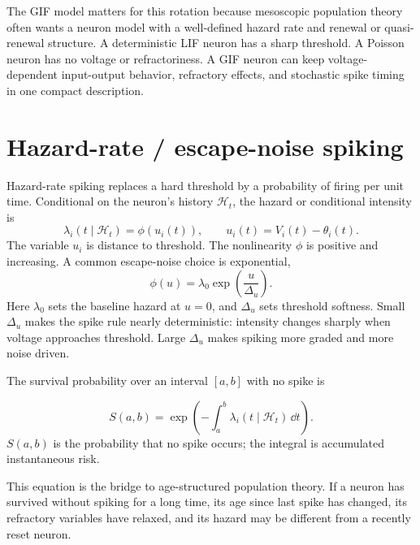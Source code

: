 The GIF model matters for this rotation because mesoscopic population theory often wants a neuron model with a well-defined hazard rate and renewal or quasi-renewal structure. A deterministic LIF neuron has a sharp threshold. A Poisson neuron has no voltage or refractoriness. A GIF neuron can keep voltage-dependent input-output behavior, refractory effects, and stochastic spike timing in one compact description.

\section{Hazard-rate / escape-noise spiking}
\label{sec:hazard-escape-noise}

Hazard-rate spiking replaces a hard threshold by a probability of firing per unit time. Conditional on the neuron's history $\mathcal{H}_t$, the hazard or conditional intensity is
%
\begin{equation}
  \lambda_i(t\mid\mathcal{H}_t)
  =
  \phi\!\left(u_i(t)\right),
  \qquad
  u_i(t)=V_i(t)-\theta_i(t).
  \label{eq:hazard-distance-threshold}
\end{equation}
%
The variable $u_i$ is distance to threshold. The nonlinearity $\phi$ is positive and increasing. A common escape-noise choice is exponential,
%
\begin{equation}
  \phi(u)
  =
  \lambda_0\exp\!\left(\frac{u}{\Delta_u}\right).
  \label{eq:exponential-escape-rate}
\end{equation}
%
Here $\lambda_0$ sets the baseline hazard at $u=0$, and $\Delta_u$ sets threshold softness. Small $\Delta_u$ makes the spike rule nearly deterministic: intensity changes sharply when voltage approaches threshold. Large $\Delta_u$ makes spiking more graded and more noise driven.

The survival probability over an interval $[a,b]$ with no spike is
%
\begin{keyequation}
\begin{equation}
  S(a,b)
  =
  \exp\!\left(
    -\int_a^b \lambda_i(t\mid\mathcal{H}_t)\,\dd t
  \right).
  \label{eq:hazard-survival}
\end{equation}
\tcblower
$S(a,b)$ is the probability that no spike occurs; the integral is accumulated instantaneous risk.
\end{keyequation}

\noindent This equation is the bridge to age-structured population theory. If a neuron has survived without spiking for a long time, its age since last spike has changed, its refractory variables have relaxed, and its hazard may be different from a recently reset neuron.

